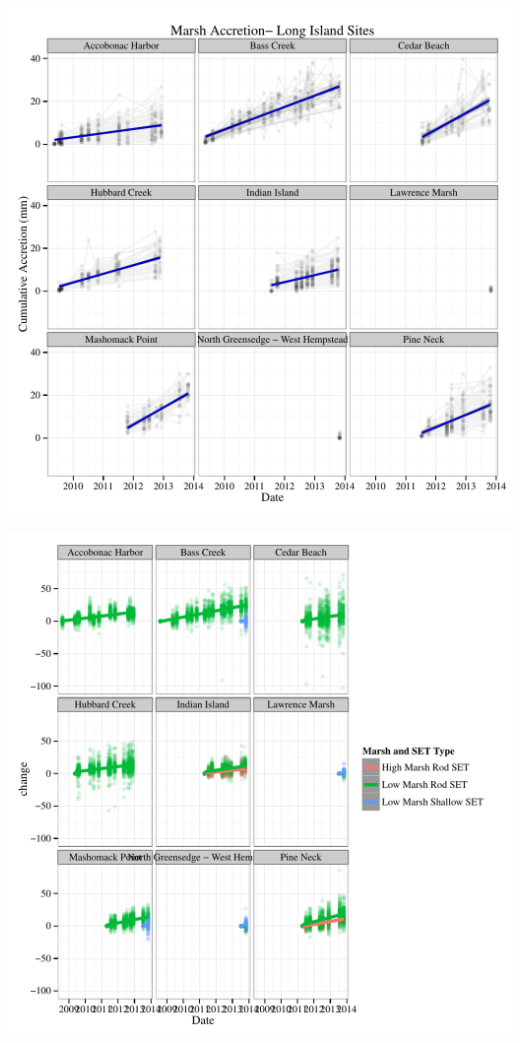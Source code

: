 \documentclass{article}\usepackage[]{graphicx}\usepackage[]{color}
\makeatletter
\def\maxwidth{ %
  \ifdim\Gin@nat@width>\linewidth
    \linewidth
  \else
    \Gin@nat@width
  \fi
}
\makeatother
\begin{document}
{\centering \includegraphics[width=\maxwidth]{figure/SA_Plots} 

}







{\centering \includegraphics[width=\maxwidth]{figure/Plot_multiLMs} 

}
\end{document}
